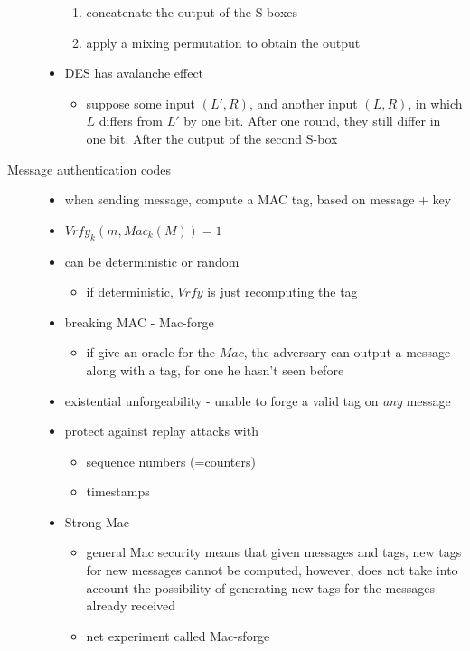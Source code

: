 \documentclass[11pt]{article}
\newcommand{\ee}[1]{\ensuremath{#1}}
\begin{document}
\begin{description}
\begin{itemize}
\begin{enumerate}
 		\item concatenate the output of the S-boxes
 		\item apply a mixing permutation to obtain the output
 		
 	\end{enumerate}
 	\item DES has avalanche effect
 	\begin{itemize}
 		\item suppose some input \ee{(L', R)}, and another input \ee{(L, R)}, in which \ee{L} differs from \ee{L'} by one bit. After one round, they still differ in one bit. After the output of the second S-box
	\end{itemize}

\end{itemize}

\item[Message authentication codes] \hfill
\begin{itemize}
	\item when sending message, compute a MAC tag, based on message + key
	\item \ee{{\mathit{Vrfy}}_k(m, \mathit{Mac}_k(M))=1}
	\item can be deterministic or random
	\begin{itemize}
		\item if deterministic, \ee{\mathit{Vrfy}} is just recomputing the tag
	\end{itemize}
	\item breaking MAC - Mac-forge
	\begin{itemize}
		\item if give an oracle for the \ee{\mathit{Mac}}, the adversary can output a message along with a tag, for one he hasn't seen before
	\end{itemize}
	\item existential unforgeability - unable to forge a valid tag on \textit{any} message
	\item protect against replay attacks with
	\begin{itemize}
		\item sequence numbers (=counters)
		\item timestamps
	\end{itemize}

	\item Strong Mac
	\begin{itemize}
		\item general Mac security means that given messages and tags, new tags for new messages cannot be computed, however, does not take into account the possibility of generating new tags for the messages already received
		\item net experiment called Mac-sforge
	\end{itemize}


\end{itemize}
\end{description}
\end{document}
